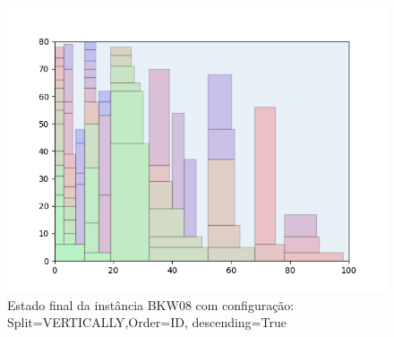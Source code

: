 \begin{figure}[H]
    \centering
    \caption[]{Estado final da instância BKW08 com configuração: Split=VERTICALLY,Order=ID, descending=True}
    \label{fig:bkw08-vertically-id-true}
    \includegraphics[scale=0.5]{output/figures/bkw/bkw08/vertically/id/true/00}
\end{figure}
